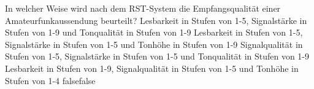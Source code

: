     {In welcher Weise wird nach dem RST-System die Empfangsqualität einer Amateurfunkaussendung beurteilt?}
    {Lesbarkeit in Stufen von 1-5,  Signalstärke in Stufen von 1-9 und  Tonqualität in Stufen von 1-9}
    {Lesbarkeit in Stufen von 1-5,  Signalstärke in Stufen von 1-5 und  Tonhöhe in Stufen von 1-9}
    {Signalqualität in Stufen von 1-5,  Signalstärke in Stufen von 1-5 und  Tonqualität in Stufen von 1-9}
    {Lesbarkeit in Stufen von 1-9,  Signalqualität in Stufen von 1-5 und  Tonhöhe in Stufen von 1-4}
    {false}{false}